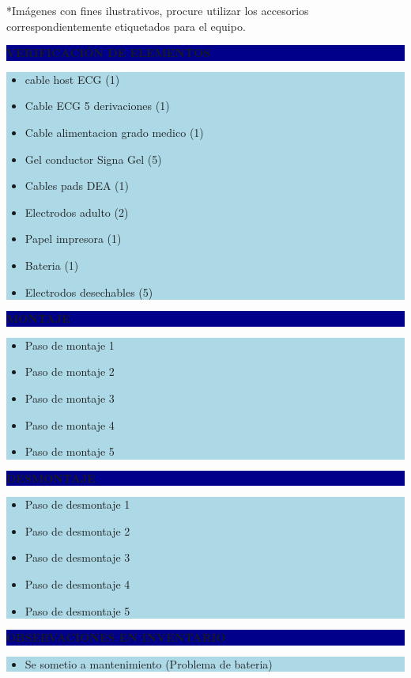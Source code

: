 \documentclass[11pt]{article}
\newcommand{\seccionbanda}[1]{%
  \vspace{0.6em}
  \noindent\colorbox{darkblue}{\parbox{\dimexpr\linewidth-2\fboxsep}{%
    \centering\color{white}\bfseries #1}}\par\vspace{0.6em}
}
\begin{document}
\vspace{0.5em}
\footnotesize{*Imágenes con fines ilustrativos, procure utilizar los accesorios correspondientemente etiquetados para el equipo.}
\normalsize

\newpage
\seccionbanda{VERIFICACIÓN DE ELEMENTOS}
\noindent\colorbox{lightblue}{\parbox{\dimexpr\linewidth-2\fboxsep\relax}{%
\begin{itemize}[label=$\square$, itemsep=4pt]
\item cable host ECG (1)
\item Cable ECG 5 derivaciones (1)
\item Cable alimentacion grado medico (1)
\item Gel conductor Signa Gel (5)
\item Cables pads DEA (1)
\item Electrodos adulto (2)
\item Papel impresora (1)
\item Bateria (1)
\item Electrodos desechables (5)
\end{itemize}
}}\par

\seccionbanda{MONTAJE}
\noindent\colorbox{lightblue}{\parbox{\dimexpr\linewidth-2\fboxsep\relax}{%
\begin{itemize}[label=$\square$, itemsep=4pt]
\item Paso de montaje 1
\item Paso de montaje 2
\item Paso de montaje 3
\item Paso de montaje 4
\item Paso de montaje 5
\end{itemize}
}}\par

\seccionbanda{DESMONTAJE}
\noindent\colorbox{lightblue}{\parbox{\dimexpr\linewidth-2\fboxsep\relax}{%
\begin{itemize}[label=$\square$, itemsep=4pt]
\item Paso de desmontaje 1
\item Paso de desmontaje 2
\item Paso de desmontaje 3
\item Paso de desmontaje 4
\item Paso de desmontaje 5
\end{itemize}
}}\par
\seccionbanda{OBSERVACIONES EN INVENTARIO}
\noindent\colorbox{lightblue}{\parbox{\dimexpr\linewidth-2\fboxsep\relax}{\begin{itemize}[itemsep=4pt]
\item Se sometio a mantenimiento (Problema de bateria)
\end{itemize}}}\par
\end{document}
